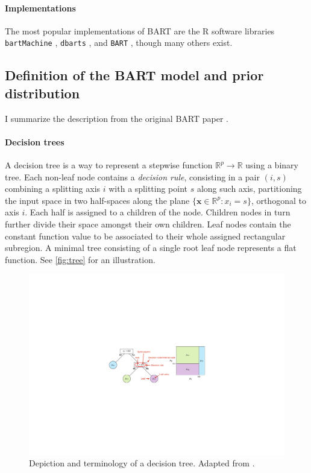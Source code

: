 \documentclass{article}
\begin{document}
    \paragraph{Implementations}

    The most popular implementations of BART are the R software libraries \texttt{bartMachine} \citep{kapelner2016,kapelner2023}, \texttt{dbarts} \citep{dorie2024}, and \texttt{BART} \citep{sparapani2021,mcculloch2024}, though many others exist.

    \subsection{Definition of the BART model and prior distribution}
    \label{sec:bartprior}

    I summarize the description from the original BART paper \citep{chipman2010}.

    \paragraph{Decision trees}
    
    A decision tree is a way to represent a stepwise function $\mathbb R^p \to \mathbb R$ using a binary tree. Each non-leaf node contains a \emph{decision rule}, consisting in a pair $(i, s)$ combining a splitting axis $i$ with a splitting point $s$ along such axis, partitioning the input space in two half-spaces along the plane $\{\mathbf x \in \mathbb R^p: x_i = s\}$, orthogonal to axis $i$. Each half is assigned to a children of the node. Children nodes in turn further divide their space amongst their own children. Leaf nodes contain the constant function value to be associated to their whole assigned rectangular subregion. A minimal tree consisting of a single root leaf node represents a flat function. See \autoref{fig:tree} for an illustration.

    \begin{figure}
        \includegraphics[width=\columnwidth]{fig1hill2020.pdf}
        \caption{\label{fig:tree} Depiction and terminology of a decision tree. Adapted from \citet{hill2020}.}
    \end{figure}
\end{document}
